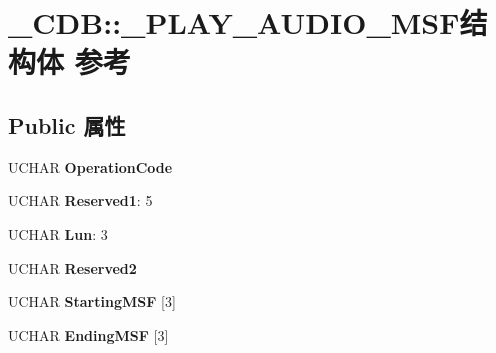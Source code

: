 \hypertarget{struct___c_d_b_1_1___p_l_a_y___a_u_d_i_o___m_s_f}{}\section{\+\_\+\+C\+DB\+:\+:\+\_\+\+P\+L\+A\+Y\+\_\+\+A\+U\+D\+I\+O\+\_\+\+M\+S\+F结构体 参考}
\label{struct___c_d_b_1_1___p_l_a_y___a_u_d_i_o___m_s_f}
\subsection*{Public 属性}
\begin{DoxyCompactItemize}
\item 
\mbox{\label{struct___c_d_b_1_1___p_l_a_y___a_u_d_i_o___m_s_f_a9ddc458146243eadd80af573ed743a7c}} 
U\+C\+H\+AR {\bfseries Operation\+Code}
\item 
\mbox{\label{struct___c_d_b_1_1___p_l_a_y___a_u_d_i_o___m_s_f_afb62a8855c601d6860a3c1de3d992a9e}} 
U\+C\+H\+AR {\bfseries Reserved1}\+: 5
\item 
\mbox{\label{struct___c_d_b_1_1___p_l_a_y___a_u_d_i_o___m_s_f_a92f7b8ec7472db5ea34ec149cc8e6a86}} 
U\+C\+H\+AR {\bfseries Lun}\+: 3
\item 
\mbox{\label{struct___c_d_b_1_1___p_l_a_y___a_u_d_i_o___m_s_f_a6e0c4b181d6c40b816277110bde6b572}} 
U\+C\+H\+AR {\bfseries Reserved2}
\item 
\mbox{\label{struct___c_d_b_1_1___p_l_a_y___a_u_d_i_o___m_s_f_a01fe7ad4f7a0bb5bcab3b04dfe1a2f3c}} 
U\+C\+H\+AR {\bfseries Starting\+M\+SF} \mbox{[}3\mbox{]}
\item 
\mbox{\label{struct___c_d_b_1_1___p_l_a_y___a_u_d_i_o___m_s_f_a884b82e9f97247a0c858deffd64fba0d}} 
U\+C\+H\+AR {\bfseries Ending\+M\+SF} \mbox{[}3\mbox{]}
\item 
\mbox{\label{struct___c_d_b_1_1___p_l_a_y___a_u_d_i_o___m_s_f_a57effbc83f4015620e8e4f2ca2be20aa}} 

\end{DoxyCompactItemize}
